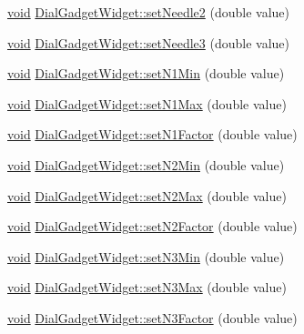 \begin{DoxyCompactItemize}
\item 
\hyperlink{group___u_a_v_objects_plugin_ga444cf2ff3f0ecbe028adce838d373f5c}{void} \hyperlink{group___dial_plugin_gaeabf2ea71c12b9ce01fcc94833468297}{\-Dial\-Gadget\-Widget\-::set\-Needle2} (double value)
\item 
\hyperlink{group___u_a_v_objects_plugin_ga444cf2ff3f0ecbe028adce838d373f5c}{void} \hyperlink{group___dial_plugin_ga7d752a6892e2e93299793b455723fe7e}{\-Dial\-Gadget\-Widget\-::set\-Needle3} (double value)
\item 
\hyperlink{group___u_a_v_objects_plugin_ga444cf2ff3f0ecbe028adce838d373f5c}{void} \hyperlink{group___dial_plugin_ga9e1d1e6690a126b564e4058c5c9a1757}{\-Dial\-Gadget\-Widget\-::set\-N1\-Min} (double value)
\item 
\hyperlink{group___u_a_v_objects_plugin_ga444cf2ff3f0ecbe028adce838d373f5c}{void} \hyperlink{group___dial_plugin_ga1686d1c9510998c11ce174fb20a785e1}{\-Dial\-Gadget\-Widget\-::set\-N1\-Max} (double value)
\item 
\hyperlink{group___u_a_v_objects_plugin_ga444cf2ff3f0ecbe028adce838d373f5c}{void} \hyperlink{group___dial_plugin_ga8b964189b1a31516fd976319be2c820c}{\-Dial\-Gadget\-Widget\-::set\-N1\-Factor} (double value)
\item 
\hyperlink{group___u_a_v_objects_plugin_ga444cf2ff3f0ecbe028adce838d373f5c}{void} \hyperlink{group___dial_plugin_gacbefbb82b1a0a45dd4ac2b96888680d8}{\-Dial\-Gadget\-Widget\-::set\-N2\-Min} (double value)
\item 
\hyperlink{group___u_a_v_objects_plugin_ga444cf2ff3f0ecbe028adce838d373f5c}{void} \hyperlink{group___dial_plugin_ga137f9d887b4877446af21bc388fea524}{\-Dial\-Gadget\-Widget\-::set\-N2\-Max} (double value)
\item 
\hyperlink{group___u_a_v_objects_plugin_ga444cf2ff3f0ecbe028adce838d373f5c}{void} \hyperlink{group___dial_plugin_gacd0d92d28bdad1d9142edc01753adc0f}{\-Dial\-Gadget\-Widget\-::set\-N2\-Factor} (double value)
\item 
\hyperlink{group___u_a_v_objects_plugin_ga444cf2ff3f0ecbe028adce838d373f5c}{void} \hyperlink{group___dial_plugin_ga0b4a5fbf9c6dcd1f01bd6efff7cc3c26}{\-Dial\-Gadget\-Widget\-::set\-N3\-Min} (double value)
\item 
\hyperlink{group___u_a_v_objects_plugin_ga444cf2ff3f0ecbe028adce838d373f5c}{void} \hyperlink{group___dial_plugin_gaa3a290185da85f7cd228c785ca2b6cc1}{\-Dial\-Gadget\-Widget\-::set\-N3\-Max} (double value)
\item 
\hyperlink{group___u_a_v_objects_plugin_ga444cf2ff3f0ecbe028adce838d373f5c}{void} \hyperlink{group___dial_plugin_gad8af67c2847f49c9c2dce641d7105f18}{\-Dial\-Gadget\-Widget\-::set\-N3\-Factor} (double value)

\end{DoxyCompactItemize}
